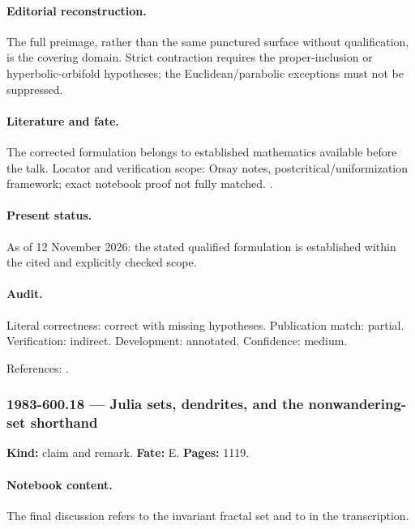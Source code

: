 \paragraph{Editorial reconstruction.} The full preimage, rather than the same punctured surface without qualification, is the covering domain. Strict contraction requires the proper-inclusion or hyperbolic-orbifold hypotheses; the Euclidean/parabolic exceptions must not be suppressed.

\paragraph{Literature and fate.} The corrected formulation belongs to established mathematics available before the talk. Locator and verification scope: Orsay notes, postcritical/uniformization framework; exact notebook proof not fully matched. \cite{douadyhubbard1985polynomes}.

\paragraph{Present status.} As of 12 November 2026: the stated qualified formulation is established within the cited and explicitly checked scope.

\paragraph{Audit.} Literal correctness: correct with missing hypotheses. Publication match: partial. Verification: indirect. Development: annotated. Confidence: medium.

\noindent References: \citep{douadyhubbard1985polynomes}.\par

\subsubsection{1983-600.18 --- Julia sets, dendrites, and the nonwandering-set shorthand}

\label{item:1983-600.18}

\noindent\textbf{Kind:} claim and remark. \textbf{Fate:} E. \textbf{Pages:} 1119.\par

\paragraph{Notebook content.} The final discussion refers to the invariant fractal set and to  in the transcription.

